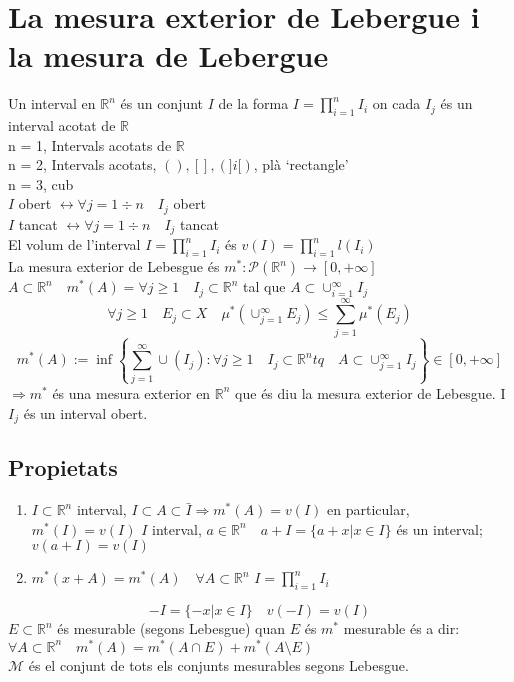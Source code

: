 \documentclass{article}
\newcommand{\R}{\mathbb{R}}
\newcommand{\M}{\mathcal{M}}
\newcommand{\PP}{\mathcal{P}}
\begin{document}
\section{La mesura exterior de Lebergue i la mesura de Lebergue}
Un interval en $\R^n$ és un conjunt $I$ de la forma $I = \prod_{i=1}^n I_i$ on cada $I_j$ és un interval acotat de $\R$\\
n = 1, Intervals acotats de $\R$\\
n = 2, Intervals acotats, $(), [], (] i [)$, plà `rectangle'\\
n = 3, cub\\
$I$ obert $\leftrightarrow \forall j = 1\div n\quad I_j$ obert\\
$I$ tancat $\leftrightarrow \forall j = 1\div n\quad I_j$ tancat\\

El volum de l'interval $I = \prod_{i=1}^nI_i$ és $v(I) = \prod_{i=1}^nl(I_i)$\\
La mesura exterior de Lebesgue és $m^*: \PP(\R^n) \to [0, +\infty]$\\
$A \subset \R^n \quad m^*(A) = \forall j \geq 1\quad I_j \subset \R^n$ tal que $A \subset \cup_{i=1}^\infty I_j$
$$\forall j \geq 1 \quad E_j \subset X \quad \mu^*(\cup_{j=1}^\infty E_j) \leq \sum_{j=1}^\infty \mu^*(E_j)$$
$$m^*(A) := \inf\left\{\sum_{j=1}^\infty \cup (I_j): \forall j \geq 1 \quad I_j \subset \R^n tq\quad A \subset \cup_{j=1}^\infty I_j\right\} \in [0,+\infty]$$
$\Rightarrow m^*$ és una mesura exterior en $\R^n$ que és diu la mesura exterior de Lebesgue. I $I_j$ és un interval obert.
\subsection{Propietats}
\begin{enumerate}
\item $I \subset \R^n$ interval, $I \subset A \subset \bar{I} \Rightarrow m^*(A) = v(I)$ en particular, $m^*(I) = v(I)$
	\subitem $I$ interval, $a \in \R^n \quad a + I = \{a+x| x \in I\}$ és un interval; $v(a+I) = v(I)$
\item $m^*(x+A) = m^*(A)\quad \forall A \subset \R^n$
	\subitem $I = \prod_{i=1}^nI_i$
\end{enumerate}
$$-I = \{-x| x \in I\}\quad v(-I) = v(I)$$
$E \subset \R^n$ és mesurable (segons Lebesgue) quan $E$ és $m^*$ mesurable és a dir: $\forall A \subset \R^n \quad m^*(A) = m^*(A\cap E) + m^*(A\setminus E)$\\
$\M$ és el conjunt de tots els conjunts mesurables segons Lebesgue.\\
\end{document}
